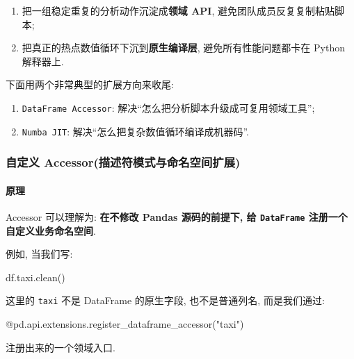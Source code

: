 \documentclass[11pt]{article}
\providecommand{\tightlist}{%
      \setlength{\itemsep}{0pt}\setlength{\parskip}{0pt}}
\newenvironment{Shaded}{}{}
\newcommand{\StringTok}[1]{\textcolor[rgb]{0.25,0.44,0.63}{{#1}}}
\newcommand{\NormalTok}[1]{{#1}}
\newcommand{\AttributeTok}[1]{\textcolor[rgb]{0.49,0.56,0.16}{{#1}}}
\begin{document}
\begin{enumerate}
\def\labelenumi{\arabic{enumi}.}
\tightlist
\item
  把一组稳定重复的分析动作沉淀成\textbf{领域 API},
  避免团队成员反复复制粘贴脚本;
\item
  把真正的热点数值循环下沉到\textbf{原生编译层}, 避免所有性能问题都卡在
  Python 解释器上.
\end{enumerate}

下面用两个非常典型的扩展方向来收尾:

\begin{enumerate}
\def\labelenumi{\arabic{enumi}.}
\tightlist
\item
  \texttt{DataFrame\ Accessor}:
  解决``怎么把分析脚本升级成可复用领域工具'';
\item
  \texttt{Numba\ JIT}: 解决``怎么把复杂数值循环编译成机器码''.
\end{enumerate}

    \subsubsection{自定义
Accessor(描述符模式与命名空间扩展)}\label{ux81eaux5b9aux4e49-accessorux63cfux8ff0ux7b26ux6a21ux5f0fux4e0eux547dux540dux7a7aux95f4ux6269ux5c55}

    \paragraph{原理}\label{ux539fux7406}

    Accessor 可以理解为: \textbf{在不修改 Pandas 源码的前提下, 给
\texttt{DataFrame} 注册一个自定义业务命名空间}.

例如, 当我们写:

\begin{Shaded}
\begin{Highlighting}[]
\NormalTok{df.taxi.clean()}
\end{Highlighting}
\end{Shaded}

这里的 \texttt{taxi} 不是 DataFrame 的原生字段, 也不是普通列名,
而是我们通过:

\begin{Shaded}
\begin{Highlighting}[]
\AttributeTok{@pd.api.extensions.register\_dataframe\_accessor}\NormalTok{(}\StringTok{"taxi"}\NormalTok{)}
\end{Highlighting}
\end{Shaded}

注册出来的一个领域入口.
\end{document}
